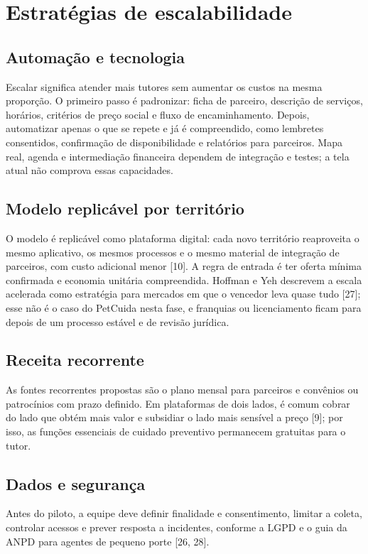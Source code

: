 \section{Estratégias de escalabilidade}

\subsection{Automação e tecnologia}

Escalar significa atender mais tutores sem aumentar os custos na mesma proporção. O primeiro passo é padronizar: ficha de parceiro, descrição de serviços, horários, critérios de preço social e fluxo de encaminhamento. Depois, automatizar apenas o que se repete e já é compreendido, como lembretes consentidos, confirmação de disponibilidade e relatórios para parceiros. Mapa real, agenda e intermediação financeira dependem de integração e testes; a tela atual não comprova essas capacidades.

\subsection{Modelo replicável por território}

O modelo é replicável como plataforma digital: cada novo território reaproveita o mesmo aplicativo, os mesmos processos e o mesmo material de integração de parceiros, com custo adicional menor [10]. A regra de entrada é ter oferta mínima confirmada e economia unitária compreendida. Hoffman e Yeh descrevem a escala acelerada como estratégia para mercados em que o vencedor leva quase tudo [27]; esse não é o caso do PetCuida nesta fase, e franquias ou licenciamento ficam para depois de um processo estável e de revisão jurídica.

\subsection{Receita recorrente}

As fontes recorrentes propostas são o plano mensal para parceiros e convênios ou patrocínios com prazo definido. Em plataformas de dois lados, é comum cobrar do lado que obtém mais valor e subsidiar o lado mais sensível a preço [9]; por isso, as funções essenciais de cuidado preventivo permanecem gratuitas para o tutor.

\subsection{Dados e segurança}

Antes do piloto, a equipe deve definir finalidade e consentimento, limitar a coleta, controlar acessos e prever resposta a incidentes, conforme a LGPD e o guia da ANPD para agentes de pequeno porte [26, 28].
